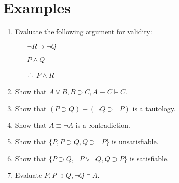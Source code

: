 \documentclass[a4paper, 11pt]{article} %
\newcommand{\set}[1]{\lbrace#1\rbrace} %
\def\therefore{\ensuremath{\ldotp\dot{}\,\ldotp}}
\begin{document}
\section*{Examples}

\begin{enumerate}
  \item Evaluate the following argument for validity:
    \begin{itemize}
      \item[] $\neg R \supset \neg Q$
      \item[] $P \wedge Q$
      \item[\therefore] $P \wedge R$
    \end{itemize}
  \item Show that $A \vee B, B \supset C, A \equiv C \vDash C$.
  \item Show that $(P \supset Q) \equiv (\neg Q \supset \neg P)$ is a tautology.
  \item Show that $A \equiv \neg A$ is a contradiction.
  \item Show that $\{P, P \supset Q, Q \supset \neg P\}$ is unsatisfiable. 
  \item Show that $\set{P \supset Q, \neg P \vee \neg Q, Q \supset P}$ is satisfiable.
  \item Evaluate $P, P \supset Q, \neg Q \vDash A$.
\end{enumerate}
\end{document}

